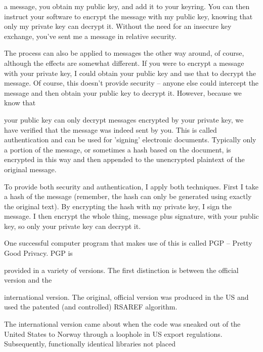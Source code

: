 \documentclass[a4paper,11pt]{book}
\begin{document}
\noindent a message, you obtain my public key, and add it to your keyring. You can then instruct your software to encrypt the message with my public key, knowing that only my private key can decrypt it. Without the need for an insecure key exchange, you've sent me a message in relative security.

\noindent 

\noindent The process can also be applied to messages the other way around, of course, although the effects are somewhat different. If you were to encrypt a message with your private key, I could obtain your public key and use that to decrypt the message. Of course, this doesn't provide security -- anyone else could intercept the message and then obtain your public key to decrypt it. However, because we know that

\noindent your public key can only decrypt messages encrypted by your private key, we have verified that the message was indeed sent by you. This is called authentication and can be used for 'signing' electronic documents. Typically only a portion of the message, or sometimes a hash based on the document, is encrypted in this way and then appended to the unencrypted plaintext of the original message.

\noindent 

\noindent To provide both security and authentication, I apply both techniques. First I take a hash of the message (remember, the hash can only be generated using exactly the original text). By encrypting the hash with my private key, I sign the message. I then encrypt the whole thing, message plus signature, with your public key, so only your private key can decrypt it.

\noindent 

\noindent 

\noindent One successful computer program that makes use of this is called PGP -- Pretty Good Privacy. PGP is

\noindent provided in a variety of versions. The first distinction is between the official version and the

\noindent international version. The original, official version was produced in the US and used the patented (and controlled) RSAREF algorithm.

\noindent 

\noindent The international version came about when the code was sneaked out of the United States to Norway through a loophole in US export regulations. Subsequently, functionally identical libraries not placed
\end{document}
